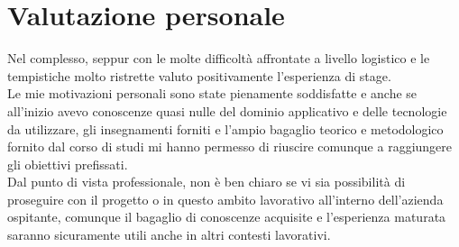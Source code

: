 \section{Valutazione personale}

Nel complesso, seppur con le molte difficoltà affrontate a livello logistico e le tempistiche molto ristrette valuto positivamente l'esperienza di stage. \\
Le mie motivazioni personali sono state pienamente soddisfatte e anche se all'inizio avevo conoscenze quasi nulle del dominio applicativo e delle tecnologie da utilizzare, gli insegnamenti forniti e l'ampio bagaglio teorico e metodologico fornito dal corso di studi mi hanno permesso di riuscire comunque a raggiungere gli obiettivi prefissati.\\
Dal punto di vista professionale, non è ben chiaro se vi sia possibilità di proseguire con il progetto o in questo ambito lavorativo all'interno dell'azienda ospitante, comunque il bagaglio di conoscenze acquisite e l'esperienza maturata saranno sicuramente utili anche in altri contesti lavorativi.